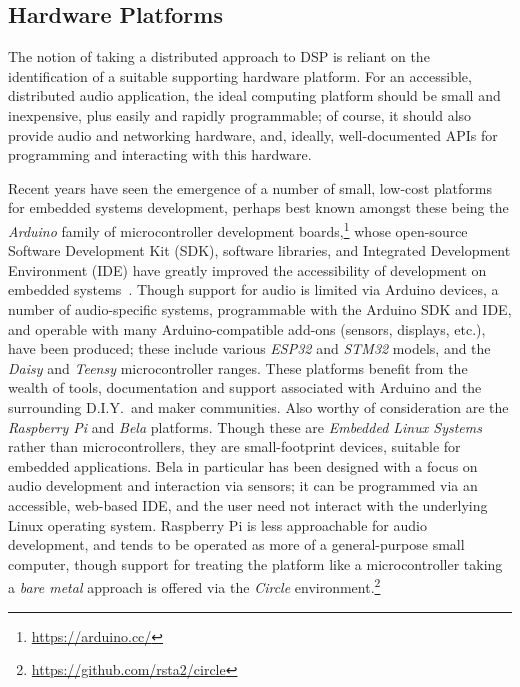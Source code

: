 \subsection{Hardware Platforms}\label{subsec:hardware-platforms}

The notion of taking a distributed approach to DSP is reliant on the
identification of a suitable supporting hardware platform.
For an accessible, distributed audio application, the ideal computing platform
should be small and inexpensive, plus easily and rapidly programmable;
of course, it should also provide audio and networking hardware, and, ideally,
well-documented APIs for programming and interacting with this hardware.

Recent years have seen the emergence of a number of small, low-cost platforms
for embedded systems development, perhaps best known amongst these being the
\textit{Arduino} family of microcontroller development boards,\footnote{
    \url{https://arduino.cc/}
}
whose open-source Software Development Kit (SDK), software libraries, and
Integrated Development Environment (IDE) have greatly improved the
accessibility of development on embedded systems~\citep{michon_embedded_2020}.
Though support for audio is limited via Arduino devices, a number of
audio-specific systems, programmable with the Arduino SDK and IDE, and
operable with many Arduino-compatible add-ons (sensors, displays, etc.), have
been produced;
these include various \textit{ESP32} and \textit{STM32} models, and the
\textit{Daisy} and \textit{Teensy} microcontroller ranges.
These platforms benefit from the wealth of tools, documentation and support
associated with Arduino and the surrounding D.I.Y.\ and maker communities.
Also worthy of consideration are the \textit{Raspberry Pi} and \textit{Bela}
platforms.
Though these are \textit{Embedded Linux Systems} rather than microcontrollers,
they are small-footprint devices, suitable for embedded applications.
Bela in particular has been designed with a focus on audio development and
interaction via sensors; it can be programmed via an accessible, web-based IDE,
and the user need not interact with the underlying Linux operating system.
Raspberry Pi is less approachable for audio development, and tends to be
operated as more of a general-purpose small computer, though support for
treating the platform like a microcontroller \textemdash{} taking a
\textit{bare metal} approach \textemdash{} is offered via the \textit{Circle}
environment.\footnote{\url{https://github.com/rsta2/circle}}

